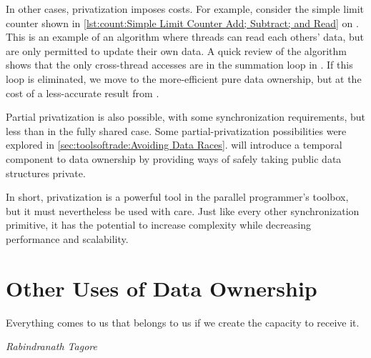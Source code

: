 In other cases, privatization imposes costs.
For example, consider the simple limit counter shown in
\cref{lst:count:Simple Limit Counter Add; Subtract; and Read} on
.
This is an example of an algorithm where threads can read each others'
data, but are only permitted to update their own data.
A quick review of the algorithm shows that the only cross-thread
accesses are in the summation loop in .
If this loop is eliminated, we move to the more-efficient pure
data ownership, but at the cost of a less-accurate result
from .

\QuickQuizEnd

Partial privatization is also possible, with some synchronization
requirements, but less than in the fully shared case.
Some partial-privatization possibilities were explored in
\cref{sec:toolsoftrade:Avoiding Data Races}.
 will introduce a temporal component
to data ownership by providing ways of safely taking public data
structures private.

In short, privatization is a powerful tool in the parallel programmer's
toolbox, but it must nevertheless be used with care.
Just like every other synchronization primitive, it has the potential
to increase complexity while decreasing performance and scalability.

\section{Other Uses of Data Ownership}
\label{sec:owned:Other Uses of Data Ownership}
%
\epigraph{Everything comes to us that belongs to us if we create the
	  capacity to receive it.}
	 {\emph{Rabindranath Tagore}}

